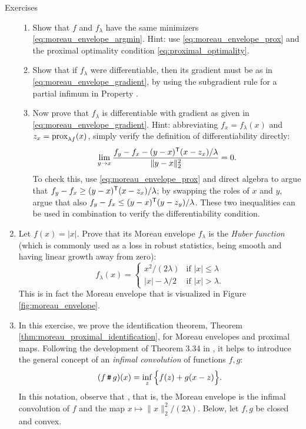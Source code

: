 \begin{xcb}{Exercises}
\begin{enumerate}[label=\thechapter.\arabic*]
\begin{enumerate}[label=\alph*.]
\item Show that $f$ and $f_\lambda$ have the same minimizers
  \eqref{eq:moreau_envelope_argmin}. Hint: use \eqref{eq:moreau_envelope_prox}
  and the proximal optimality condition \eqref{eq:proximal_optimality}. 

\item Show that if $f_\lambda$ were differentiable, then its gradient must be as
  in \eqref{eq:moreau_envelope_gradient}, by using the subgradient rule for a
  partial infimum in Property .   

\item Now prove that $f_\lambda$ is differentiable with gradient as given in
  \eqref{eq:moreau_envelope_gradient}. Hint: abbreviating $f_x = f_\lambda(x)$
  and $z_x = \operatorname{prox}_{\lambda f}(x)$, simply verify the definition of
  differentiability directly: 
  \[
  \lim_{y \to x} \frac{f_y - f_x - (y - x)^{\mathsf{T}} (x - z_x) / \lambda}{\|y-x\|_2^2} 
  = 0.
  \]
  To check this, use \eqref{eq:moreau_envelope_prox} and direct algebra to argue 
  that $f_y - f_x \geq (y - x)^{\mathsf{T}} (x - z_x) / \lambda$; by swapping the roles of
  $x$ and $y$, argue that also $f_y - f_x \leq (y - x)^{\mathsf{T}} (y - z_y) / \lambda$. 
  These two inequalities can be used in combination to verify the
  differentiability condition.     
\end{enumerate}

\item Let $f(x) = |x|$. Prove that its Moreau envelope $f_\lambda$ is the 
  \emph{Huber function} (which is commonly used as a loss in robust statistics,
  being smooth and having linear growth away from zero): 
  \[
  f_\lambda(x) = 
  \begin{cases}
  x^2/ (2\lambda) & \text{if $|x| \leq \lambda$} \\
  |x| - \lambda/2 & \text{if $|x| > \lambda$}.
  \end{cases}
  \]
  This is in fact the Moreau envelope that is visualized in Figure
  \ref{fig:moreau_envelope}.  

\item \label{ex:moreau_proximal_identification}
  In this exercise, we prove the identification theorem, Theorem
  \ref{thm:moreau_proximal_identification}, for Moreau envelopes and proximal
  maps. Following the development of Theorem 3.34 in
  \cite{rockafellar2009variational}, it helps to introduce the general concept 
  of an \emph{infimal convolution} of functions $f,g$: 
  \[
  (f \operatorname{\texttt{\#}} g)(x) = \inf_z \Big\{ f(z) + g(x-z) \Big\}.
  \]
  In this notation, observe that , that is, the Moreau envelope is the infimal convolution of $f$
  and the map $x \mapsto \|x\|_2^2 /  (2\lambda)$. Below, let $f,g$ be closed
  and convex.   


\end{enumerate}
\end{xcb}
